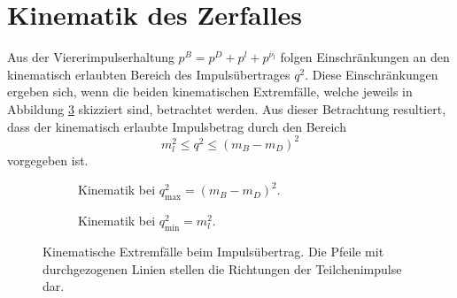 \section{Kinematik des Zerfalles}
\label{sec:kinematik}
Aus der Viererimpulserhaltung $p^B = p^D + p^l + p^{\overline{\nu}_l}$ folgen Einschränkungen an den kinematisch erlaubten Bereich des Impulsübertrages $q^2$.
Diese Einschränkungen ergeben sich, wenn die beiden kinematischen Extremfälle, welche jeweils in Abbildung \ref{fig:recoil} skizziert sind, betrachtet werden.
Aus dieser Betrachtung resultiert, dass der kinematisch erlaubte Impulsbetrag durch den Bereich
\begin{equation}
  m_l^2 \leq q^2 \leq (m_B - m_D)^2
  \label{eqn:kinematik}
\end{equation}
vorgegeben ist.
\begin{figure}
  \centering
  \begin{subfigure}{0.48\textwidth}
    \centering
    \caption{Kinematik bei $q_\text{max}^2 = (m_B - m_D)^2$.}
    \label{fig:recoil1}
  \end{subfigure}
  \begin{subfigure}{0.48\textwidth}
    \centering
    \caption{Kinematik bei $q_\text{min}^2 = m_l^2$.}
    \label{fig:recoil2}
  \end{subfigure}
  \caption{Kinematische Extremfälle beim Impulsübertrag. Die Pfeile mit durchgezogenen Linien stellen die Richtungen der Teilchenimpulse dar.}
  \label{fig:recoil}
\end{figure}

